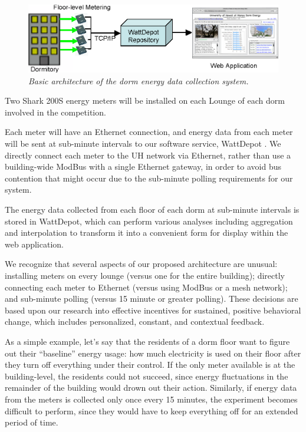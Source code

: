 \documentclass[11pt]{article}
\begin{document}
\begin{figure}[!ht]
  \center
  \includegraphics[width=1.0\textwidth]{architecture.ppt.eps}
  \caption{\em \small Basic architecture of the dorm energy data collection system.}
 \label{fig:architecture}
\end{figure} 

Two Shark 200S energy meters will be installed on each Lounge of each dorm involved in
the competition. 

Each meter will have an Ethernet connection, and energy data from each
meter will be sent at sub-minute intervals to our software service,
WattDepot \cite{WattDepot}.  We directly connect each meter to the UH network via Ethernet,
rather than use a building-wide ModBus with a single Ethernet gateway, in
order to avoid bus contention that might occur due to the sub-minute
polling requirements for our system.

The energy data collected from each floor of each dorm at sub-minute
intervals is stored in WattDepot, which can perform various analyses
including aggregation and interpolation to transform it into a
convenient form for display within the web application.

We recognize that several aspects of our proposed architecture are unusual:
installing meters on every lounge (versus one for the entire building);
directly connecting each meter to Ethernet (versus using ModBus or a mesh
network); and sub-minute polling (versus 15 minute or greater polling).
These decisions are based upon our research into effective incentives for
sustained, positive behavioral change, which includes personalized,
constant, and contextual feedback.  

As a simple example, let's say that the residents of a dorm floor want to
figure out their ``baseline'' energy usage: how much electricity is used on
their floor after they turn off everything under their control.  If the
only meter available is at the building-level, the residents could not
succeed, since energy fluctuations in the remainder of the building would
drown out their action.  Similarly, if energy data from the meters is collected
only once every 15 minutes, the experiment becomes difficult to perform,
since they would have to keep everything off for an extended period of
time.  
\end{document}
